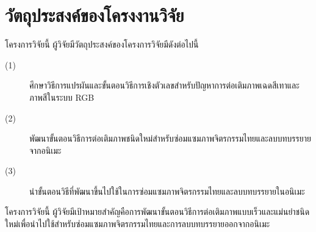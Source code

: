 \clearpage
\section{วัตถุประสงค์ของโครงงานวิจัย}
\hspace{1cm} โครงการวิจัยนี้ ผู้วิจัยมีวัตถุประสงค์ของโครงการวิจัยมีดังต่อไปนี้

\begin{description}
	\item[(1)] ศึกษาวิธีการแปรผันและขั้นตอนวิธีการเชิงตัวเลขสำหรับปัญหาการต่อเติมภาพเฉดสีเทาและภาพสีในระบบ RGB
	\item[(2)] พัฒนาขั้นตอนวิธีการต่อเติมภาพชนิดใหม่สำหรับซ่อมแซมภาพจิตรกรรมไทยและลบบทบรรยายจากอนิเมะ
	\item[(3)] นำขั้นตอนวิธีที่พัฒนาขึ้นไปใช้ในการซ่อมแซมภาพจิตรกรรมไทยและลบบทบรรยายในอนิเมะ
\end{description}

โครงการวิจัยนี้ ผู้วิจัยมีเป้าหมายสำคัญคือการพัฒนาขั้นตอนวิธีการต่อเติมภาพแบบเร็วและแม่นยำชนิดใหม่เพื่อนำไปใช้สำหรับซ่อมแซมภาพจิตรกรรมไทยและการลบบทบรรยายออกจากอนิเมะ